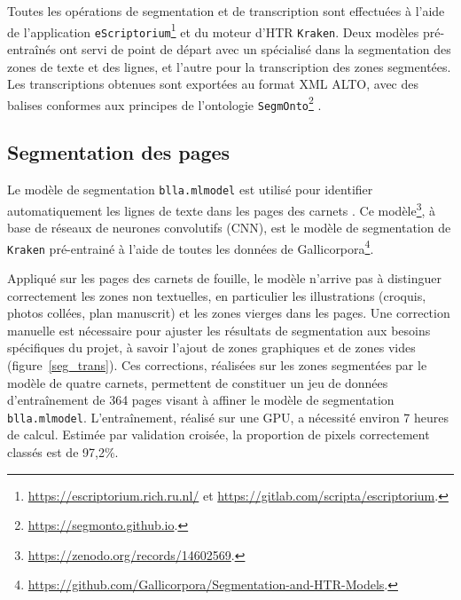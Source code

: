 \documentclass[final, fra]{anthology-ch}     %
\begin{document}
Toutes les opérations de segmentation et de transcription sont effectuées à l’aide de l'application \texttt{eScriptorium}\footnote{\url{https://escriptorium.rich.ru.nl/} et \url{https://gitlab.com/scripta/escriptorium}.} et du moteur d'HTR \texttt{Kraken}. Deux modèles pré-entraînés ont servi de point de départ avec un spécialisé dans la segmentation des zones de texte et des lignes, et l'autre pour la transcription des zones segmentées. Les transcriptions obtenues sont exportées au format XML ALTO, avec des balises conformes aux principes de l’ontologie \texttt{SegmOnto}\footnote{\url{https://segmonto.github.io}.} \cite{Gabay024}.

\subsection{Segmentation des pages}
Le modèle de segmentation \texttt{blla.mlmodel} est utilisé pour identifier automatiquement les lignes de texte dans les pages des carnets \cite{kiessling2020}. Ce modèle\footnote{\url{https://zenodo.org/records/14602569}.}, à base de réseaux de neurones convolutifs (CNN), est le modèle de segmentation de \texttt{Kraken} pré-entrainé à l'aide de toutes les données de Gallicorpora\footnote{\url{https://github.com/Gallicorpora/Segmentation-and-HTR-Models}.}.


Appliqué sur les pages des carnets de fouille, le modèle n'arrive pas à distinguer correctement les zones non textuelles, en particulier les illustrations (croquis, photos collées, plan manuscrit) et les zones vierges dans les pages. Une correction manuelle est nécessaire pour ajuster les résultats de segmentation aux besoins spécifiques du projet, à savoir l’ajout de zones graphiques et de zones vides (figure~\ref{seg_trans}). Ces corrections, réalisées sur les zones segmentées par le modèle de quatre carnets, permettent de constituer un jeu de données d’entraînement de 364 pages visant à affiner le modèle de segmentation \texttt{blla.mlmodel}. L’entraînement, réalisé sur une GPU, a nécessité environ 7 heures de calcul. Estimée par validation croisée, la proportion de pixels correctement classés est de 97,2\%.
\end{document}
